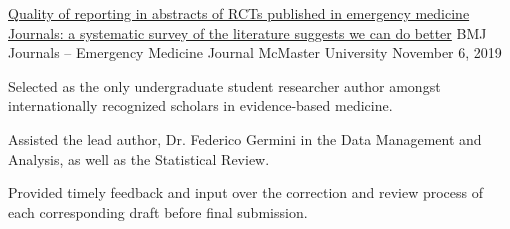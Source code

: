 


\begin{cventries}

  \cventry
    {\href{https://emj.bmj.com/content/early/2019/11/06/emermed-2019-208629}{Quality of reporting in abstracts of RCTs published in emergency medicine Journals: a systematic survey of the literature suggests we can do better}} %
    {BMJ Journals – Emergency Medicine Journal} %
    {McMaster University} %
    {November 6, 2019} %
    {
      \begin{cvitems} %
        \item {Selected as the only undergraduate student researcher author amongst internationally recognized scholars in evidence-based medicine.}
        \item {Assisted the lead author, Dr. Federico Germini in the Data Management and Analysis, as well as the  Statistical Review.}
        \item {Provided timely feedback and input over the correction and review process of each corresponding draft before final submission.}
      \end{cvitems}
    }

\end{cventries}
